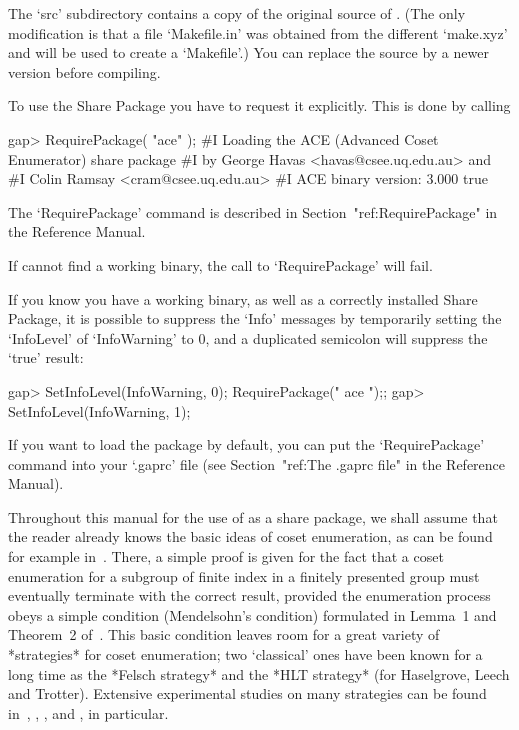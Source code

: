 The  `src' subdirectory  contains a  copy  of the  original source  of
{\ACE}.  (The  only modification  is  that  a  file `Makefile.in'  was
obtained from  the different `make.xyz' and  will be used  to create a
`Makefile'.)  You  can replace  the source by  a newer  version before
compiling.


To use the {\ACE} Share Package you have  to  request  it  explicitly.
This is done by calling

\beginexample
gap> RequirePackage( "ace" );
#I  Loading the ACE (Advanced Coset Enumerator) share package
#I           by George Havas <havas@csee.uq.edu.au> and
#I              Colin Ramsay <cram@csee.uq.edu.au>
#I                   ACE binary version: 3.000
true
\endexample

The      `RequirePackage'      command      is      described       in
Section~"ref:RequirePackage" in the {\GAP} Reference Manual.

If {\GAP} cannot find a working binary, the call  to  `RequirePackage'
will fail.

If you know you have a working {\ACE} binary, as well as  a  correctly
installed {\ACE} Share Package, it is possible to suppress the  `Info'
messages by temporarily setting the `InfoLevel' of `InfoWarning' to 0,
and a duplicated semicolon will suppress the `true' result:

\beginexample
gap> SetInfoLevel(InfoWarning, 0); RequirePackage(" ace ");;
gap> SetInfoLevel(InfoWarning, 1);
\endexample

If you want to load the {\ACE} package by default, you  can  put   the
`RequirePackage' command into your `.gaprc' file (see Section~"ref:The
.gaprc file" in the {\GAP} Reference Manual).


Throughout this manual for  the  use  of  {\ACE}  as  a  {\GAP}  share
package, we shall assume that the reader already knows the basic ideas
of coset enumeration, as can be  found  for  example  in~\cite{Neu82}.
There, a simple proof is given for the fact that a  coset  enumeration
for a subgroup of finite index in  a  finitely  presented  group  must
eventually terminate with the correct result, provided the enumeration
process obeys a simple condition (Mendelsohn's  condition)  formulated
in Lemma~1 and Theorem~2 of~\cite{Neu82}. This basic condition  leaves
room for a great variety  of  *strategies*  for  coset
enumeration; two \lq{}classical' ones have been known for a long  time
as the *Felsch  strategy*
and  the  *HLT  strategy*  (for
Haselgrove, Leech and Trotter). Extensive experimental studies on many
strategies can be found in~\cite{CDHW73}, \cite{Hav91},  \cite{HR99a},
and \cite{HR99b}, in particular.

